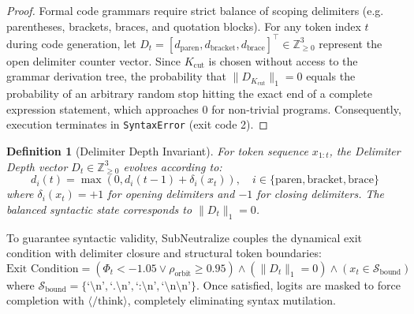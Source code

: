 \documentclass[10pt,twocolumn,letterpaper]{article}
\newtheorem{definition}{Definition}
\begin{document}
\begin{proof}
Formal code grammars require strict balance of scoping delimiters (e.g. parentheses, brackets, braces, and quotation blocks). For any token index $t$ during code generation, let $D_t = [d_{\text{paren}}, d_{\text{bracket}}, d_{\text{brace}}]^\top \in \mathbb{Z}_{\ge 0}^3$ represent the open delimiter counter vector. Since $K_{\text{cut}}$ is chosen without access to the grammar derivation tree, the probability that $\|D_{K_{\text{cut}}}\|_1 = 0$ equals the probability of an arbitrary random stop hitting the exact end of a complete expression statement, which approaches 0 for non-trivial programs. Consequently, execution terminates in \texttt{SyntaxError} (exit code 2).
\end{proof}

\begin{definition}[Delimiter Depth Invariant]
For token sequence $x_{1:t}$, the Delimiter Depth vector $D_t \in \mathbb{Z}_{\ge 0}^3$ evolves according to:
\begin{equation}
d_i(t) = \max\left(0, d_i(t-1) + \delta_i(x_t)\right), \quad i \in \{\text{paren}, \text{bracket}, \text{brace}\}
\end{equation}
where $\delta_i(x_t) = +1$ for opening delimiters and $-1$ for closing delimiters. The balanced syntactic state corresponds to $\|D_t\|_1 = 0$.
\end{definition}

To guarantee syntactic validity, SubNeutralize couples the dynamical exit condition with delimiter closure and structural token boundaries:
\begin{equation}
\text{Exit Condition} = (\Phi_t < -1.05 \lor \rho_{\text{orbit}} \ge 0.95) \land (\|D_t\|_1 = 0) \land (x_t \in \mathcal{S}_{\text{bound}})
\end{equation}
where $\mathcal{S}_{\text{bound}} = \{\text{`\textbackslash n'}, \text{`.\textbackslash n'}, \text{`:\textbackslash n'}, \text{`\textbackslash n\textbackslash n'}\}$. Once satisfied, logits are masked to force completion with $\langle/\text{think}\rangle$, completely eliminating syntax mutilation.
\end{document}
